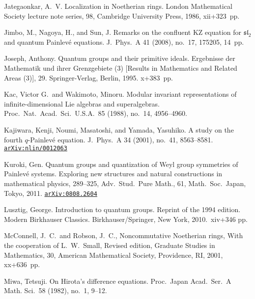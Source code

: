 \documentclass[12pt,twoside]{article}
\newcommand\arxivref[1]{\href{http://arxiv.org/abs/#1}{\tt arXiv:#1}}
\theoremstyle{plain} %
\theoremstyle{definition} %
\theoremstyle{definition} %
\numberwithin{theorem}{section}
\numberwithin{equation}{section}
\numberwithin{figure}{section}
\numberwithin{table}{section}
\begin{document}
\begin{thebibliography}{99}
Jategaonkar, A.~V.
Localization in Noetherian rings.
London Mathematical Society lecture note series, 98, 
Cambridge University Press, 1986, xii+323~pp.

Jimbo, M., Nagoya, H., and  Sun, J. 
Remarks on the confluent KZ equation for $\mathfrak{sl}_2$ 
and quantum Painlev\'e equations. 
J.\ Phys.\ A 41 (2008), no.~17, 175205, 14~pp. 

Joseph, Anthony.
Quantum groups and their primitive ideals.
Ergebnisse der Mathematik und ihrer Grenzgebiete (3) 
[Results in Mathematics and Related Areas (3)], 29. 
Springer-Verlag, Berlin, 1995. x+383~pp. 

Kac, Victor G.\ and Wakimoto, Minoru.
Modular invariant representations of infinite-dimensional Lie algebras and superalgebras.
Proc.\ Nat.\ Acad.\ Sci.\ U.S.A.\ 85 (1988), no.~14, 4956--4960.

Kajiwara, Kenji, Noumi, Masatoshi, and Yamada, Yasuhiko. 
A study on the fourth $q$-Painlev\'e equation. 
J.\ Phys.\ A 34 (2001), no.~41, 8563–8581.
\arxivref{nlin/0012063}

Kuroki, Gen.
Quantum groups and quantization of Weyl group symmetries of Painlev\'e systems. 
Exploring new structures and natural constructions in mathematical physics, 
289--325, Adv.\ Stud.\ Pure Math., 61, Math.\ Soc.\ Japan, Tokyo, 2011.
\arxivref{0808.2604}

Lusztig, George. 
Introduction to quantum groups. 
Reprint of the 1994  edition.  
Modern Birkhauser Classics. 
Birkhauser/Springer, New York, 2010.\ xiv+346 pp. 

McConnell, J.~C.\ and Robson, J.~C., 
Noncommutative Noetherian rings,
With the cooperation of L.~W.~Small, 
Revised edition, 
Graduate Studies in Mathematics, 30, 
American Mathematical Society, Providence, RI, 2001, xx+636~pp.


Miwa, Tetsuji.
On Hirota's difference equations. 
Proc.\ Japan Acad.\ Ser.~A Math. Sci.\ 58 (1982), no.~1, 9--12. 



\end{thebibliography}
\end{document}
